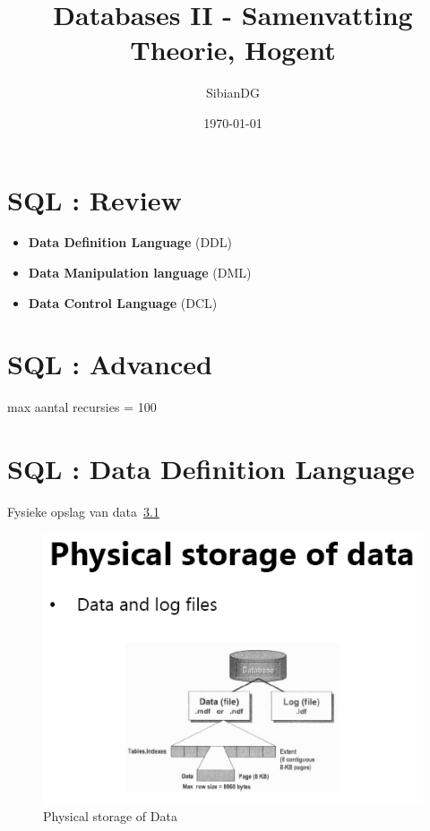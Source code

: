 \documentclass{report}
\title{Databases II - Samenvatting Theorie, Hogent}
\author{SibianDG}
\date{\today}
\begin{document}
    \maketitle
    \tableofcontents
    \newpage
    
{\let\clearpage\relax \chapter{SQL : Review}}
    
    \begin{theo}

        \begin{itemize}
            \item \textbf{Data Definition Language} (DDL) 
            \item \textbf{Data Manipulation language} (DML)
            \item \textbf{Data Control Language} (DCL)
        \end{itemize}
    \end{theo}    

{\let\clearpage\relax \chapter{SQL : Advanced}}
    
    max aantal recursies = 100

{\let\clearpage\relax \chapter{SQL : Data Definition Language}}
    
    Fysieke opslag van data~\ref{fig:physicalStorageOfData}
    \begin{figure}
        \includegraphics[width=350pt]{./images/storageData.png}
        \caption{\label{fig:physicalStorageOfData}Physical storage of Data}
    \end{figure}
\end{document}
